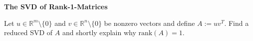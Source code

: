 \textbf{\normalsize The SVD of Rank-1-Matrices}

Let $u\in \mathbb{R}^m \setminus \{0\}$ and $v \in \mathbb{R}^n \setminus \{0\}$ be nonzero vectors and define $A := uv^T$. Find a reduced SVD of $A$ and shortly explain why $\text{rank}(A)=1$.